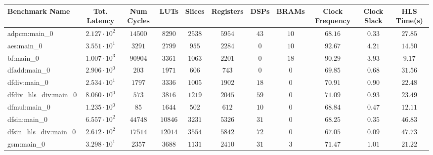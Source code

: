 \begin{tabular}{|l|c|c|c|c|c|c|c|c|c|c|}
\hline
Benchmark Name          & Tot. Latency           & Num Cycles & LUTs      & Slices    & Registers & DSPs    & BRAMs   & Clock Frequency & Clock Slack & HLS Time(s) \\
\hline
adpcm:main\_0           & $ 2.127 \cdot 10^{2} $ & $ 14500  $ & $ 8290  $ & $ 2538  $ & $ 5954  $ & $ 43  $ & $ 10  $ & $ 68.16       $ & $ 0.33    $ & $ 27.85   $ \\
aes:main\_0             & $ 3.551 \cdot 10^{1} $ & $ 3291   $ & $ 2799  $ & $ 955   $ & $ 2284  $ & $ 0   $ & $ 10  $ & $ 92.67       $ & $ 4.21    $ & $ 14.50   $ \\
bf:main\_0              & $ 1.007 \cdot 10^{3} $ & $ 90904  $ & $ 3361  $ & $ 1063  $ & $ 2201  $ & $ 0   $ & $ 18  $ & $ 90.29       $ & $ 3.93    $ & $ 9.17    $ \\
dfadd:main\_0           & $ 2.906 \cdot 10^{0} $ & $ 203    $ & $ 1971  $ & $ 606   $ & $ 743   $ & $ 0   $ & $ 0   $ & $ 69.85       $ & $ 0.68    $ & $ 31.56   $ \\
dfdiv:main\_0           & $ 2.534 \cdot 10^{1} $ & $ 1797   $ & $ 3336  $ & $ 1005  $ & $ 1902  $ & $ 18  $ & $ 0   $ & $ 70.91       $ & $ 0.90    $ & $ 22.48   $ \\
dfdiv\_hls\_div:main\_0 & $ 8.060 \cdot 10^{0} $ & $ 573    $ & $ 3816  $ & $ 1219  $ & $ 2045  $ & $ 59  $ & $ 0   $ & $ 71.09       $ & $ 0.93    $ & $ 23.49   $ \\
dfmul:main\_0           & $ 1.235 \cdot 10^{0} $ & $ 85     $ & $ 1644  $ & $ 502   $ & $ 612   $ & $ 10  $ & $ 0   $ & $ 68.84       $ & $ 0.47    $ & $ 12.11   $ \\
dfsin:main\_0           & $ 6.557 \cdot 10^{2} $ & $ 44748  $ & $ 10846 $ & $ 3231  $ & $ 5326  $ & $ 31  $ & $ 0   $ & $ 68.25       $ & $ 0.35    $ & $ 46.83   $ \\
dfsin\_hls\_div:main\_0 & $ 2.612 \cdot 10^{2} $ & $ 17514  $ & $ 12014 $ & $ 3554  $ & $ 5842  $ & $ 72  $ & $ 0   $ & $ 67.05       $ & $ 0.09    $ & $ 47.73   $ \\
gsm:main\_0             & $ 3.298 \cdot 10^{1} $ & $ 2357   $ & $ 3688  $ & $ 1131  $ & $ 2410  $ & $ 31  $ & $ 3   $ & $ 71.47       $ & $ 1.01    $ & $ 21.22   $ \\

\end{tabular}
